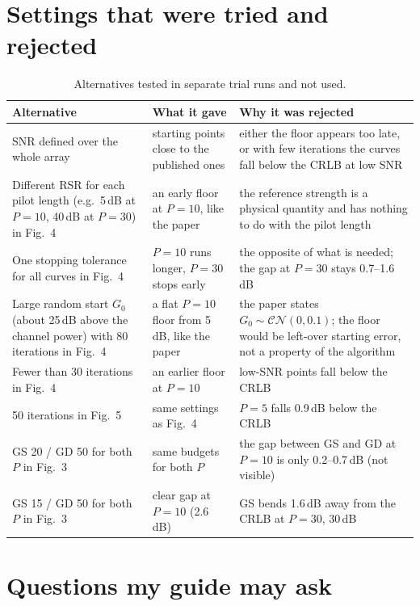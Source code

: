 \documentclass[11pt,a4paper]{article}
\begin{document}
\section{Settings that were tried and rejected}
\label{sec:rejected}

\begin{table}[h!]
\centering
\small
\caption{Alternatives tested in separate trial runs and not used.}
\begin{tabularx}{\textwidth}{L{4.2cm} Y Y}
\toprule
Alternative & What it gave & Why it was rejected \\
\midrule
SNR defined over the whole array & starting points close to the published ones & either the floor appears too late, or with few iterations the curves fall below the CRLB at low SNR \\
Different RSR for each pilot length (e.g.\ 5\,dB at $P=10$, 40\,dB at $P=30$) in Fig.~4 & an early floor at $P=10$, like the paper & the reference strength is a physical quantity and has nothing to do with the pilot length \\
One stopping tolerance for all curves in Fig.~4 & $P=10$ runs longer, $P=30$ stops early & the opposite of what is needed; the gap at $P=30$ stays 0.7--1.6\,dB \\
Large random start $G_0$ (about 25\,dB above the channel power) with 80 iterations in Fig.~4 & a flat $P=10$ floor from 5\,dB, like the paper & the paper states $G_0\sim\mathcal{CN}(0,0.1)$; the floor would be left-over starting error, not a property of the algorithm \\
Fewer than 30 iterations in Fig.~4 & an earlier floor at $P=10$ & low-SNR points fall below the CRLB \\
50 iterations in Fig.~5 & same settings as Fig.~4 & $P=5$ falls 0.9\,dB below the CRLB \\
GS 20 / GD 50 for both $P$ in Fig.~3 & same budgets for both $P$ & the gap between GS and GD at $P=10$ is only 0.2--0.7\,dB (not visible) \\
GS 15 / GD 50 for both $P$ in Fig.~3 & clear gap at $P=10$ (2.6\,dB) & GS bends 1.6\,dB away from the CRLB at $P=30$, 30\,dB \\
\bottomrule
\end{tabularx}
\end{table}

\section{Questions my guide may ask}
\label{sec:qa}
\end{document}
